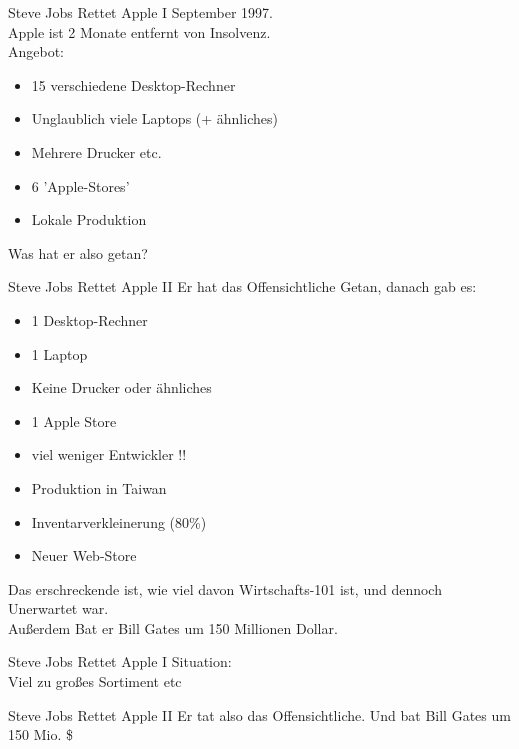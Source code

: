 \ifonline
\begin{frame}{Steve Jobs Rettet Apple I}
    September 1997. \\
    Apple ist 2 Monate entfernt von Insolvenz. \\
    \pause
    Angebot: \\
    \begin{itemize}
        \item 15 verschiedene Desktop-Rechner
        \item Unglaublich viele Laptops (+ ähnliches)
        \item Mehrere Drucker etc.
        \item 6 'Apple-Stores'
        \item Lokale Produktion
    \end{itemize}
    \pause

    Was hat er also getan?

\end{frame}
\begin{frame}{Steve Jobs Rettet Apple II}
    \small
    Er hat das Offensichtliche Getan\pause,
    danach gab es:
    \begin{itemize}
        \item 1 Desktop-Rechner
        \item 1 Laptop
        \item Keine Drucker oder ähnliches
        \item 1 Apple Store
        \item viel weniger Entwickler !!
        \item Produktion in Taiwan
        \item Inventarverkleinerung (80\%)
        \item Neuer Web-Store
    \end{itemize}
    \pause
    Das erschreckende ist, wie viel davon Wirtschafts-101 ist,
    und dennoch Unerwartet war. \\
    \pause
    Außerdem Bat er Bill Gates um 150 Millionen Dollar.
\end{frame}
\else
\begin{frame}[c]{Steve Jobs Rettet Apple I}
    Situation: \\
    \pause
    Viel zu großes Sortiment etc
\end{frame}

\begin{frame}[c]{Steve Jobs Rettet Apple II}
    Er tat also das Offensichtliche.
    \newline
    \newline
    \pause
    Und bat Bill Gates um 150 Mio. \$
\end{frame}
\fi


